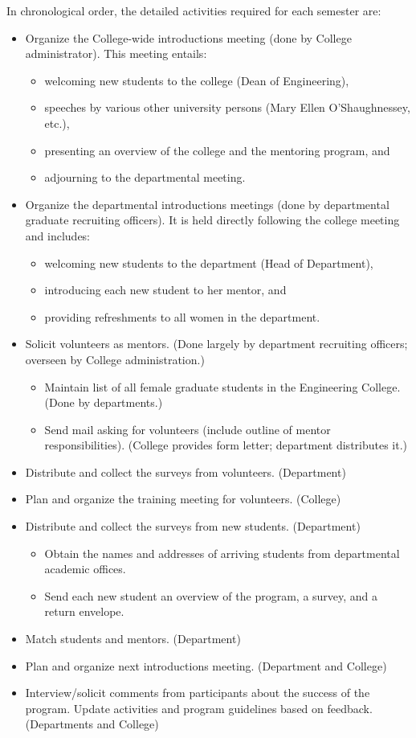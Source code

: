 \noindent
In chronological order, the detailed activities required for each
semester are:
\begin{itemize}
\item{Organize the College-wide introductions meeting
(done by College administrator).
This meeting entails:}
\begin{itemize}
\item{welcoming new students to the college (Dean of Engineering),}
\item{speeches by various other university persons (Mary Ellen O'Shaughnessey,
etc.),}
\item{presenting an overview of the college and the mentoring program, and }
\item{adjourning to the departmental meeting.}
\end{itemize}
\item{Organize the departmental introductions meetings
(done by departmental graduate recruiting officers).  It is held directly 
following the college meeting and includes:}
\begin{itemize}
\item{welcoming new students to the department (Head of Department),}
\item{introducing each new student to her mentor, and }
\item{providing refreshments to all women in the department.}
\end{itemize}
\item{Solicit volunteers as mentors. (Done largely by department recruiting officers;
overseen by College administration.)}
\begin{itemize}
\item{Maintain list of all female graduate students in the Engineering College.
(Done by departments.)}
\item{Send mail asking for volunteers (include outline of 
mentor responsibilities). (College provides form letter; department
distributes it.)}
\end{itemize}
\item{Distribute and collect the surveys from volunteers. (Department)}
\item{Plan and organize the training meeting for volunteers. (College)}
\item{Distribute and collect the surveys from new students.  (Department)}
\begin{itemize}
\item{Obtain the names and addresses of arriving students from 
departmental academic offices.}
\item{Send each new student an overview of the program, a survey,
and a return envelope.}
\end{itemize}
\item{Match students and mentors. (Department) }
\item{Plan and organize next introductions meeting.  (Department and College)}
\item{Interview/solicit comments from participants about the
success of the program.  Update activities and program 
guidelines based on feedback.  (Departments and College)}
\end{itemize}

